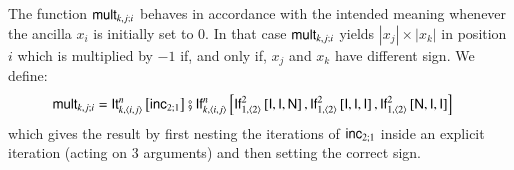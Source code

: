 The function $ \mathsf{mult}_{k,j;i} $ behaves in accordance with the intended meaning whenever 
the ancilla $ x_i$ is initially set to $0$. In that case
$ \mathsf{mult}_{k,j;i} $ yields $ |x_j|\times |x_k| $ in position $ i $ which is multiplied by $ -1 $
if, and only if, $ x_j $ and $ x_k $ have different sign. We define:
\begin{align*}
\rprMult_{k,j;i} 
& = 
\rprIt{n}{k,\langle i,j\rangle}{ %
	                            \rprInc_{2;1}
                               }
\rprSeq
\rprIf{n}{k,\langle i,j\rangle}
      {\rprIf{2}{1,\langle 2\rangle}
             {\rprId}{\rprId}{\rprNeg}}
      {\rprIf{2}{1,\langle 2\rangle}
             {\rprId}{\rprId}{\rprId}}
      {\rprIf{2}{1,\langle 2\rangle}
             {\rprNeg}{\rprId}{\rprId}} 
\end{align*}
which gives the result by first nesting the iterations of $ \mathsf{inc}_{2;1} $ inside an explicit iteration 
(acting on 3 arguments) and then setting the correct sign.


